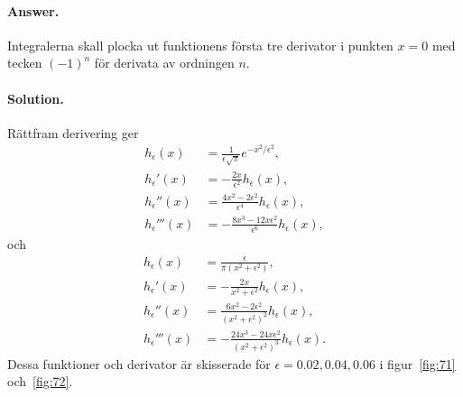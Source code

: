 \documentclass[%
oneside,                 %
final,                   %
10pt]{article}
\newenvironment{doconceexercise}{}{}
\begin{document}
\begin{doconceexercise}
\begin{enumerate}
\noindent
\end{enumerate}

\noindent


\paragraph{Answer.}
Integralerna skall plocka ut funktionens första tre derivator i punkten $x=0$ med tecken $(-1)^n$ för derivata av ordningen $n$.



\paragraph{Solution.}
Rättfram derivering ger
\begin{align}
    h_\epsilon(x)&=\frac1{\epsilon\sqrt\pi}e^{-x^2/\epsilon^2},\\
    h_\epsilon'(x)&=-\frac{2x}{\epsilon^2}h_\epsilon(x),\\
    h_\epsilon''(x)&=\frac{4x^2-2\epsilon^2}{\epsilon^4}h_\epsilon(x),\\
    h_\epsilon'''(x)&=-\frac{8x^3-12x\epsilon^2}{\epsilon^6}h_\epsilon(x),
\end{align}
och
\begin{align}
    h_\epsilon(x)&= \frac\epsilon{\pi\left(x^2+\epsilon^2\right)},\\
    h_\epsilon'(x)&= -\frac{2 x}{x^2+\epsilon^2}h_\epsilon(x) ,\\
    h_\epsilon''(x)&= \frac{6x^2-2\epsilon^2}{\left(x^2+\epsilon^2\right)^2}h_\epsilon(x) ,\\
    h_\epsilon'''(x)&= -\frac{24 x^3 -24x\epsilon^2}{\left(x^2+\epsilon^2\right)^3}h_\epsilon(x) .
\end{align}
Dessa funktioner och derivator är skisserade för $\epsilon = 0.02,0.04,0.06$ i figur~\ref{fig:71} och~\ref{fig:72}.



\end{doconceexercise}
\end{document}
